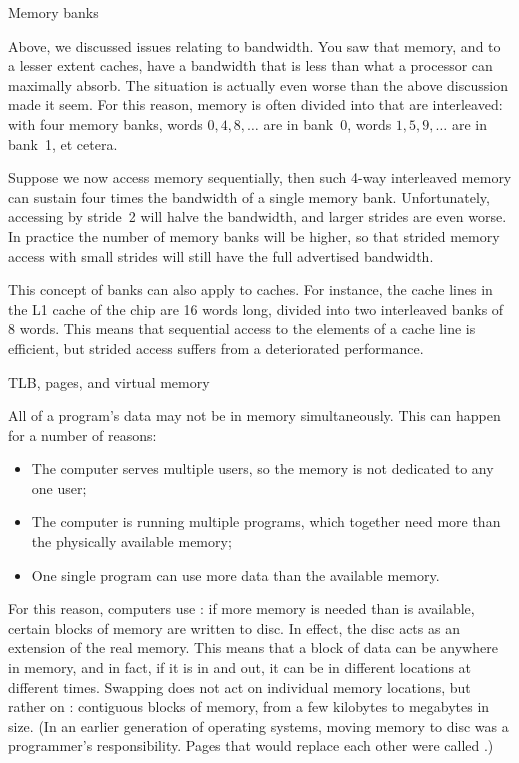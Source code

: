  {Memory banks}
\label{sec:banks}

Above, we discussed issues relating to bandwidth. You saw that memory,
and to a lesser extent caches, have a bandwidth that is less than what
a processor can maximally absorb. The situation is actually even worse
than the above discussion made it seem. For this reason, memory is
often divided into  that are interleaved: with
four memory banks, words $0,4,8,\ldots$ are in bank~0, words
$1,5,9,\ldots$ are in bank~1, et cetera. 

Suppose we now access memory sequentially, then such 4-way interleaved
memory can sustain four times the bandwidth of a single memory
bank. Unfortunately,  accessing by stride~2 will halve the bandwidth,
and larger strides are even worse. In practice the number of memory
banks will be higher, so that strided memory access with small strides
will still have the full advertised bandwidth.

This concept of banks can also apply to caches. For instance, the
cache lines in the L1 cache of the  chip
are 16 words long, divided into two interleaved banks of 8 words. This
means that sequential access to the elements of a cache line is
efficient, but strided access suffers from a deteriorated performance.


 {TLB, pages, and virtual memory}

All of a program's data may not be in memory simultaneously. This can
happen for a number of reasons:
\begin{itemize}
\item The computer serves multiple users, so the memory is not
  dedicated to any one user;
\item The computer is running multiple programs, which together need
  more than the physically available memory;
\item One single program can use more data than the available memory.
\end{itemize}
For this reason, computers use : if more
memory is needed than is available, certain blocks of memory are
written to disc. In effect, the disc acts as an extension of the real
memory. This means that a block of data can be anywhere in memory, and
in fact, if it is  in and out, it can be in
different locations at different times. Swapping does not act on
individual memory locations, but rather on :
contiguous blocks of memory, from a few kilobytes to megabytes in size.
(In an earlier generation of operating systems, moving memory to disc
was a programmer's responsibility. Pages that would replace each other
were called .)


